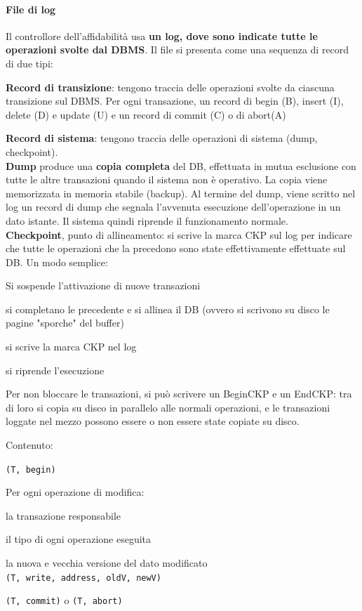 \documentclass[10pt]{book}
\begin{document}
\paragraph{File di log} Il controllore dell'affidabilità usa \textbf{un log, dove sono indicate tutte le operazioni svolte dal DBMS}. Il file si presenta come una sequenza di record di due tipi:
\begin{list}{}{}
	\item \textbf{Record di transizione}: tengono traccia delle operazioni svolte da ciascuna transizione sul DBMS. Per ogni transazione, un record di begin (B), insert (I), delete (D) e update (U) e un record di commit (C) o di abort(A)
	\item \textbf{Record di sistema}: tengono traccia delle operazioni di sistema (dump, checkpoint).\\
	\textbf{Dump} produce una \textbf{copia completa} del DB, effettuata in mutua esclusione con tutte le altre transazioni quando il sistema non è operativo. La copia viene memorizzata in memoria stabile (backup). Al termine del dump, viene scritto nel log un record di dump che segnala l'avvenuta esecuzione dell'operazione in un dato istante. Il sistema quindi riprende il funzionamento normale.\\
	\textbf{Checkpoint}, punto di allineamento: si scrive la marca CKP sul log per indicare che tutte le operazioni che la precedono sono state effettivamente effettuate sul DB. Un modo semplice:
	\begin{list}{}{}
		\item Si sospende l'attivazione di nuove transazioni
		\item si completano le precedente e si allinea il DB (ovvero si scrivono su disco le pagine "sporche" del buffer)
		\item si scrive la marca CKP nel log
		\item si riprende l'esecuzione
	\end{list}
	Per non bloccare le transazioni, si può scrivere un BeginCKP e un EndCKP: tra di loro si copia su disco in parallelo alle normali operazioni, e le transazioni loggate nel mezzo possono essere o non essere state copiate su disco.
\end{list}
Contenuto:
\begin{list}{}{}
	\item \texttt{(T, begin)}
	\item Per ogni operazione di modifica:
	\begin{list}{}{}
		\item la transazione responsabile
		\item il tipo di ogni operazione eseguita
		\item la nuova e vecchia versione del dato modificato\\
		\texttt{(T, write, address, oldV, newV)}
	\end{list}
	\item \texttt{(T, commit)} o \texttt{(T, abort)}
\end{list}
\end{document}
